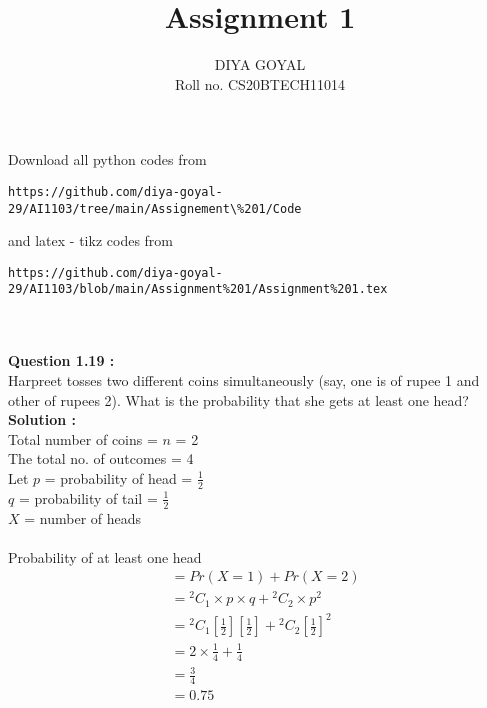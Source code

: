 \documentclass[journal,12pt,twocolumn]{IEEEtran}
\title{Assignment 1}
\author{DIYA GOYAL\\
Roll no. CS20BTECH11014}
\newcommand{\fbrack}[2]{\genfrac{[}{]}{}{}{#1}{#2}}
\begin{document}
\maketitle
\large Download all python codes from\\
\begin{lstlisting}
https://github.com/diya-goyal-29/AI1103/tree/main/Assignement\%201/Code
\end{lstlisting}


\large and latex - tikz codes from \\
\begin{lstlisting}
https://github.com/diya-goyal-29/AI1103/blob/main/Assignment%201/Assignment%201.tex
\end{lstlisting}
\\ \\
\large\textbf{Question 1.19 :} \\
Harpreet tosses two different coins simultaneously (say, one is of rupee 1 and other of rupees 2). What is the probability that she gets at least one head? \\
\large\textbf{Solution :}\\
Total number of coins = $n$ = 2\\
The total no. of outcomes = 4\\ 
Let $p$ = probability of head = $\frac{1}{2}$\\
$q$ = probability of tail = $\frac{1}{2}$\\
$X$ = number of heads\\ \\
Probability of at least one head
    \begin{align}
         &= {Pr(X = 1)} + {Pr(X = 2)} \\
         &= {^2 C _1}\times{p}\times{q} + {^2 C _2}\times{p^2}\\
         &= {^2 C _1} \fbrack{1}{2} \fbrack{1}{2} + {^2 C _2} {\fbrack{1}{2}}^2\\ 
         &= 2 \times \frac{1}{4} + \frac{1}{4}\\
         &= \frac{3}{4}\\
         &= 0.75
    \end{align}
\end{document}
